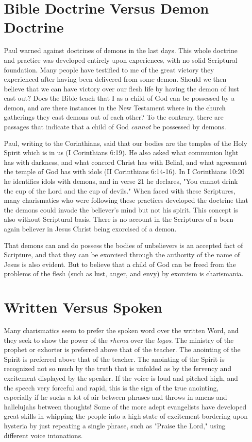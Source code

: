 \section*{Bible Doctrine Versus Demon Doctrine}

Paul warned against doctrines of demons in the last days. This whole doctrine and practice was developed entirely upon experiences, with no solid Scriptural foundation. Many people have testified to me of the great victory they experienced after having been delivered from some demon. Should we then believe that we can have victory over our flesh life by having the demon of lust cast out? Does the Bible teach that I as a child of God can be possessed by a demon, and are there instances in the New Testament where in the church gatherings they cast demons out of each other? To the contrary, there are passages that indicate that a child of God \emph{cannot} be possessed by demons. 

Paul, writing to the Corinthians, said that our bodies are the temples of the Holy Spirit which is in us (I Corinthians 6:19). He also asked what communion light has with darkness, and what concord Christ has with Belial, and what agreement the temple of God has with idols (II Corinthians 6:14-16). In I Corinthians 10:20 he identifies idols with demons, and in verse 21 he declares, "You cannot drink the cup of the Lord and the cup of devils." When faced with these Scriptures, many charismatics who were following these practices developed the doctrine that the demons could invade the believer's mind but not his spirit. This concept is also without Scriptural basis. There is no account in the Scriptures of a born-again believer in Jesus Christ being exorcised of a demon. 

That demons can and do possess the bodies of unbelievers is an accepted fact of Scripture, and that they can be exorcised through the authority of the name of Jesus is also evident. But to believe that a child of God can be freed from the problems of the flesh (such as lust, anger, and envy) by exorcism is charismania. 

\section*{Written Versus Spoken}

Many charismatics seem to prefer the spoken word over the written Word, and they seek to show the power of the \emph{rhema} over the \emph{logos}. The ministry of the prophet or exhorter is preferred above that of the teacher. The anointing of the Spirit is preferred above that of the teacher. The anointing of the Spirit is recognized not so much by the truth that is unfolded as by the fervency and excitement displayed by the speaker. If the voice is loud and pitched high, and the speech very forceful and rapid, this is the sign of the true anointing, especially if he sucks a lot of air between phrases and throws in amens and hallelujahs between thoughts! Some of the more adept evangelists have developed great skills in whipping the people into a high state of excitement bordering upon hysteria by just repeating a single phrase, such as "Praise the Lord," using different voice intonations. 

